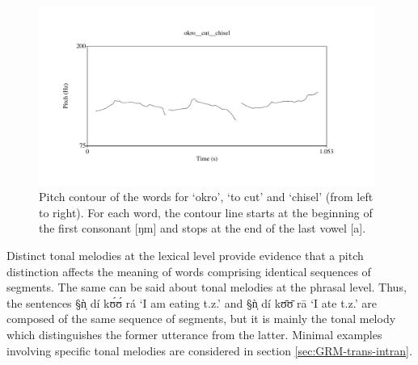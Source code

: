 % 
 \begin{figure}
 \centering
\includegraphics[width=11cm]{Graphic/Pictures/3sounds.pdf}
 \caption[Pitch contour of three words]{Pitch contour of the words for
 `okro', `to cut' and `chisel' (from left to right).  For each word, the contour
line starts at the beginning of the first consonant [ŋm] and  stops at the end
of the last vowel [a]. \label{fig:PHO-min-triplet}}
 \end{figure} 

% 
% 
% 
% 

Distinct tonal melodies at the lexical level provide evidence that a pitch
distinction affects the meaning of words comprising identical sequences of
segments. The same can be said about tonal melodies at the phrasal level. Thus,
the sentences {\S ǹ̩ dí kʊ́ʊ́ rá} `I am eating t.z.' and {\S ǹ̩ dí kʊ̄ʊ̄
rā} `I ate t.z.' are composed of the same sequence of segments, but
it is mainly  the tonal
melody which distinguishes the former utterance from the latter.   Minimal
examples involving  specific tonal melodies are considered  in section
\ref{sec:GRM-trans-intran}.



